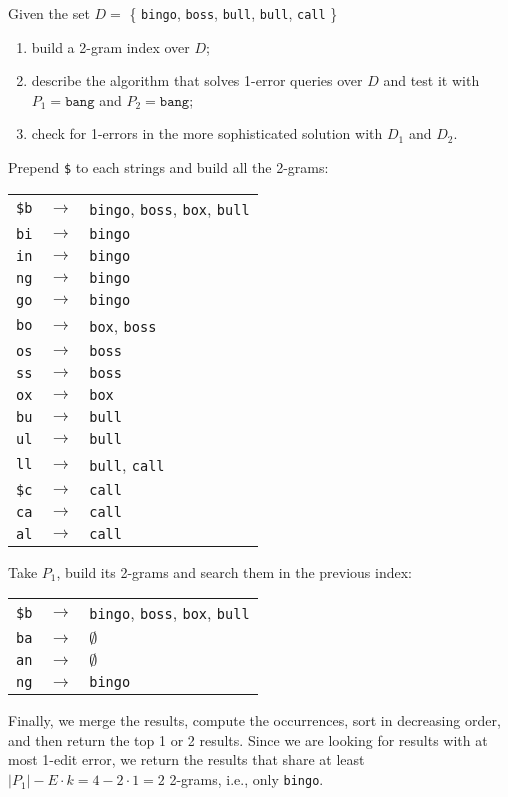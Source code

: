\exercise

Given the set $D =$ \{ \texttt{bingo}, \texttt{boss}, \texttt{bull},
\texttt{bull}, \texttt{call} \}
%
\begin{enumerate}
  \item build a 2-gram index over $D$;
  \item describe the algorithm that solves 1-error queries over $D$ and test it
  with $P_1 = \texttt{bang}$ and $P_2 = \texttt{bang}$;
  \item check for 1-errors in the more sophisticated solution with $D_1$ and
  $D_2$.
\end{enumerate}

\solution

Prepend \texttt{\$} to each strings and build all the 2-grams:
%
\begin{longtable}{ccl}
  \texttt{\$b} & $\rightarrow$ & \texttt{bingo}, \texttt{boss},
  \texttt{box}, \texttt{bull} \\
  \texttt{bi} & $\rightarrow$ & \texttt{bingo} \\
  \texttt{in} & $\rightarrow$ & \texttt{bingo} \\
  \texttt{ng} & $\rightarrow$ & \texttt{bingo} \\
  \texttt{go} & $\rightarrow$ & \texttt{bingo} \\
  \texttt{bo} & $\rightarrow$ & \texttt{box}, \texttt{boss} \\
  \texttt{os} & $\rightarrow$ & \texttt{boss}\\
  \texttt{ss} & $\rightarrow$ & \texttt{boss} \\
  \texttt{ox} & $\rightarrow$ & \texttt{box} \\
  \texttt{bu} & $\rightarrow$ & \texttt{bull} \\
  \texttt{ul} & $\rightarrow$ & \texttt{bull} \\
  \texttt{ll} & $\rightarrow$ & \texttt{bull}, \texttt{call} \\
  \texttt{\$c} & $\rightarrow$ & \texttt{call} \\
  \texttt{ca} & $\rightarrow$ & \texttt{call} \\
  \texttt{al} & $\rightarrow$ & \texttt{call} \\
\end{longtable}
%
Take $P_1$, build its 2-grams and search them in the previous index:
%
\begin{longtable}{ccl}
  \texttt{\$b} & $\rightarrow$ & \texttt{bingo}, \texttt{boss},
  \texttt{box}, \texttt{bull} \\
  \texttt{ba} & $\rightarrow$ & $\emptyset$ \\
  \texttt{an} & $\rightarrow$ & $\emptyset$ \\
  \texttt{ng} & $\rightarrow$ & \texttt{bingo} \\
\end{longtable}
%
Finally, we merge the results, compute the occurrences, sort in decreasing
order, and then return the top 1 or 2 results. Since we are looking for results
with at most 1-edit error, we return the results that share at least $|P_1| -
E \cdot k = 4 - 2 \cdot 1 = 2$ 2-grams, i.e., only \texttt{bingo}.


